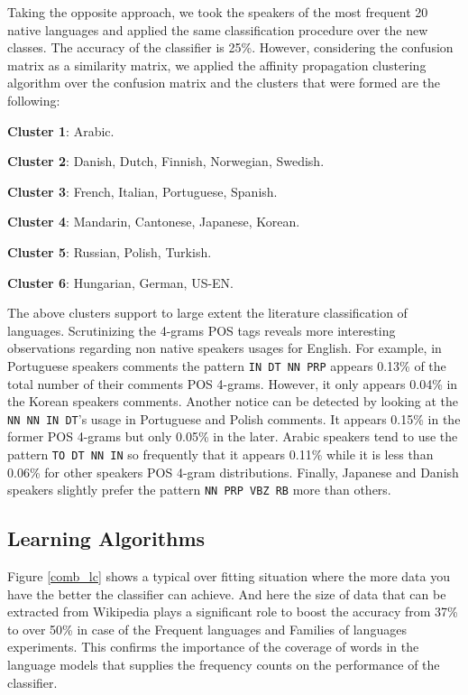 \documentclass[10pt,a5paper,twoside]{article}
\begin{document}
Taking the opposite approach, we took the speakers of the most frequent 20
native languages and applied the same classification procedure over the new
classes. The accuracy of the classifier is 25\%. However, considering the
confusion matrix as a similarity matrix, we applied the affinity propagation
clustering algorithm \cite{sklearn} over the confusion matrix and the clusters
that were formed are the following:
\begin{compactitem}
\item \textbf{Cluster 1}: Arabic.
\item \textbf{Cluster 2}: Danish, Dutch, Finnish, Norwegian, Swedish.
\item \textbf{Cluster 3}: French, Italian, Portuguese, Spanish.
\item \textbf{Cluster 4}: Mandarin, Cantonese, Japanese, Korean.
\item \textbf{Cluster 5}: Russian, Polish, Turkish.
\item \textbf{Cluster 6}: Hungarian, German, US-EN.
\end{compactitem}

The above clusters support to large extent the literature classification of
languages. Scrutinizing the 4-grams POS tags reveals more interesting
observations regarding non native speakers usages for English. For example,
in Portuguese speakers comments the pattern \verb+IN DT NN PRP+ appears 0.13\%
of the total number of their comments POS 4-grams. However, it only appears
0.04\% in the Korean speakers comments. Another notice can be detected by
looking at the \verb+NN NN IN DT+'s usage in Portuguese and Polish comments. It
appears 0.15\% in the former POS 4-grams but only 0.05\% in the later. Arabic
speakers tend to use the pattern \verb+TO DT NN IN+ so frequently that it
appears 0.11\% while it is less than 0.06\% for other speakers POS 4-gram
distributions. Finally, Japanese and Danish speakers slightly prefer the pattern
\verb+NN PRP VBZ RB+ more than others.

\subsection{Learning Algorithms}

Figure \ref{comb_lc} shows a typical over fitting situation where the more data
you have the better the classifier can achieve. And here the size of data that
can be extracted from Wikipedia plays a significant role to boost the accuracy
from 37\% to over 50\% in case of the Frequent languages and Families of
languages experiments. This confirms the importance of the coverage of words in
the language models that supplies the frequency counts on the performance of the classifier.
\end{document}
